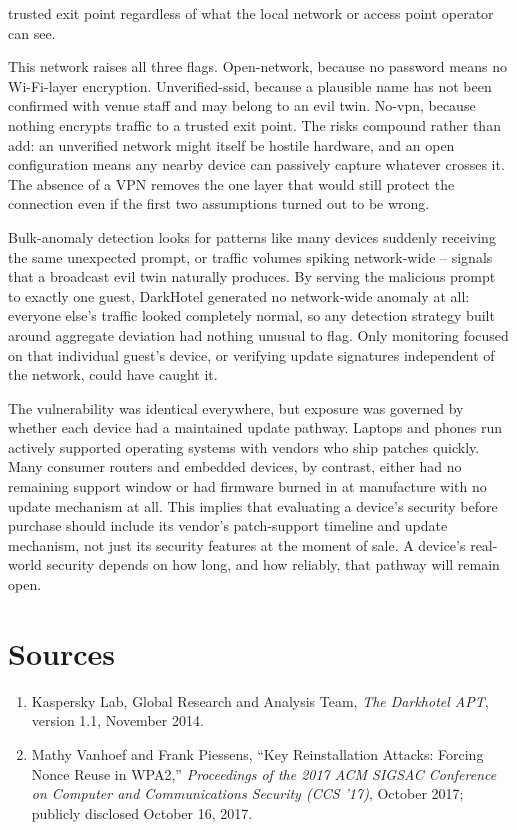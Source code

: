\begin{answerkey}
trusted exit point regardless of what the local network or access point operator can see.
\item This network raises all three flags. Open-network, because no password means no Wi-Fi-layer
encryption. Unverified-ssid, because a plausible name has not been confirmed with venue staff and
may belong to an evil twin. No-vpn, because nothing encrypts traffic to a trusted exit point. The
risks compound rather than add: an unverified network might itself be hostile hardware, and an open
configuration means any nearby device can passively capture whatever crosses it. The absence of a
VPN removes the one layer that would still protect the connection even if the first two assumptions
turned out to be wrong.
\item Bulk-anomaly detection looks for patterns like many devices suddenly receiving the same
unexpected prompt, or traffic volumes spiking network-wide -- signals that a broadcast evil twin
naturally produces. By serving the malicious prompt to exactly one guest, DarkHotel generated no
network-wide anomaly at all: everyone else's traffic looked completely normal, so any detection
strategy built around aggregate deviation had nothing unusual to flag. Only monitoring focused on
that individual guest's device, or verifying update signatures independent of the network, could
have caught it.
\item The vulnerability was identical everywhere, but exposure was governed by whether each
device had a maintained update pathway. Laptops and phones run actively supported operating
systems with vendors who ship patches quickly. Many consumer routers and embedded devices, by
contrast, either had no remaining support window or had firmware burned in at manufacture with no
update mechanism at all. This implies that evaluating a device's security before purchase should
include its vendor's patch-support timeline and update mechanism, not just its security features at
the moment of sale. A device's real-world security depends on how long, and how reliably, that
pathway will remain open.
\end{answerkey}

\section*{Sources}
\begin{enumerate}[label=\lbrack\arabic*\rbrack, leftmargin=2.2em]
\item {}Kaspersky Lab, Global Research and Analysis Team, \emph{The Darkhotel APT},
version 1.1, November 2014.
\item {}Mathy Vanhoef and Frank Piessens, ``Key Reinstallation Attacks: Forcing Nonce
Reuse in WPA2,'' \emph{Proceedings of the 2017 ACM SIGSAC Conference on Computer and Communications
Security (CCS '17)}, October 2017; publicly disclosed October 16, 2017.
\end{enumerate}
